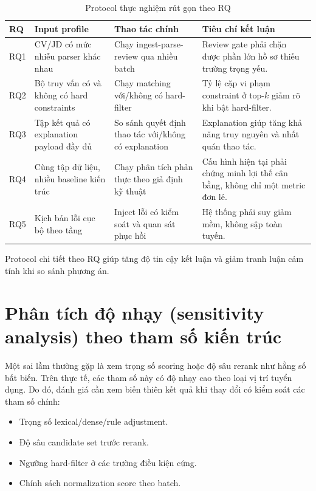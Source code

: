 \begin{table}[H]
\caption{Protocol thực nghiệm rút gọn theo RQ}
\centering
\begin{tabularx}{\textwidth}{p{}p{}p{}X}
\toprule
\textbf{RQ} & \textbf{Input profile} & \textbf{Thao tác chính} & \textbf{Tiêu chí kết luận}\\
\midrule
RQ1 & CV/JD có mức nhiễu parser khác nhau & Chạy ingest-parse-review qua nhiều batch & Review gate phải chặn được phần lớn hồ sơ thiếu trường trọng yếu.\\
RQ2 & Bộ truy vấn có và không có hard constraints & Chạy matching với/không có hard-filter & Tỷ lệ cặp vi phạm constraint ở top-$k$ giảm rõ khi bật hard-filter.\\
RQ3 & Tập kết quả có explanation payload đầy đủ & So sánh quyết định thao tác với/không có explanation & Explanation giúp tăng khả năng truy nguyên và nhất quán thao tác.\\
RQ4 & Cùng tập dữ liệu, nhiều baseline kiến trúc & Chạy phân tích phản thực theo giả định kỹ thuật & Cấu hình hiện tại phải chứng minh lợi thế cân bằng, không chỉ một metric đơn lẻ.\\
RQ5 & Kịch bản lỗi cục bộ theo tầng & Inject lỗi có kiểm soát và quan sát phục hồi & Hệ thống phải suy giảm mềm, không sập toàn tuyến.\\
\bottomrule
\end{tabularx}
\end{table}

Protocol chi tiết theo RQ giúp tăng độ tin cậy kết luận và giảm tranh luận cảm tính khi so sánh phương án.

\section{Phân tích độ nhạy (sensitivity analysis) theo tham số kiến trúc}

Một sai lầm thường gặp là xem trọng số scoring hoặc độ sâu rerank như hằng số bất biến. Trên thực tế, các tham số này có độ nhạy cao theo loại vị trí tuyển dụng. Do đó, đánh giá cần xem biến thiên kết quả khi thay đổi có kiểm soát các tham số chính:

\begin{itemize}
  \item Trọng số lexical/dense/rule adjustment.
  \item Độ sâu candidate set trước rerank.
  \item Ngưỡng hard-filter ở các trường điều kiện cứng.
  \item Chính sách normalization score theo batch.
\end{itemize}

